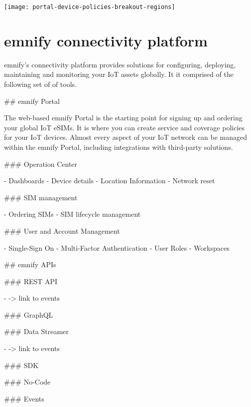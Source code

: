 \documentclass[11pt, oneside]{article}   	%
\newcommand{\addspace}{\vspace{2mm}}
\begin{document}
\begin{center}
  \addspace
  \texttt{[image: portal-device-policies-breakout-regions]}
\end{center}

\pagebreak[4]

\section{emnify connectivity platform}

\begin{markdown}

emnify's connectivity platform provides solutions for configuring, deploying, maintaining and monitoring your IoT assets globally.
It it comprised of the following set of of tools.

## emnify Portal

The web-based emnify Portal is the starting point for signing up and ordering your global IoT eSIMs.
It is where you can create service and coverage policies for your IoT devices.
Almost every aspect of your IoT network can be managed within the emnify Portal, including integrations with third-party solutions. 

### Operation Center
\end{markdown}
\addspace
\begin{markdown}
- Dashboards
- Device details
- Location Information
- Network reset
\end{markdown}
\addspace
\begin{markdown}
### SIM management
\end{markdown}
\addspace
\begin{markdown}
- Ordering SIMs
- SIM lifecycle management
\end{markdown}
\addspace
\begin{markdown}
### User and Account Management
\end{markdown}
\addspace
\begin{markdown}
- Single-Sign On
- Multi-Factor Authentication
- User Roles
- Workspaces
\end{markdown}
\addspace
\begin{markdown}
## emnify APIs

### REST API

- -> link to events

### GraphQL

### Data Streamer

- -> link to events

### SDK

### No-Code

### Events

\end{markdown}
\end{document}
